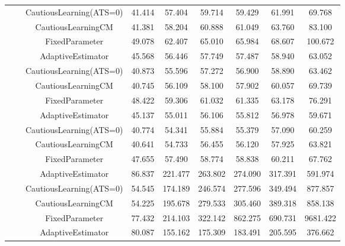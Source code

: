 \begin{table}[!h]
\begin{tabular}[t]{ccccccccc}
 &  & CautiousLearning(ATS=0) & 41.414 & 57.404 & 59.714 & 59.429 & 61.991 & 69.768\\

 &  & CautiousLearningCM & 41.381 & 58.204 & 60.888 & 61.049 & 63.760 & 83.100\\

 & \multirow[t]{-4}{*}{\centering\arraybackslash 1.00} & FixedParameter & 49.078 & 62.407 & 65.010 & 65.984 & 68.607 & 100.672\\
\cmidrule{2-9}
 &  & AdaptiveEstimator & 45.568 & 56.446 & 57.749 & 57.487 & 58.940 & 63.052\\

 &  & CautiousLearning(ATS=0) & 40.873 & 55.596 & 57.272 & 56.900 & 58.890 & 63.462\\

 &  & CautiousLearningCM & 40.745 & 56.109 & 58.100 & 57.902 & 60.057 & 69.739\\

 & \multirow[t]{-4}{*}{\centering\arraybackslash 1.25} & FixedParameter & 48.422 & 59.306 & 61.032 & 61.335 & 63.178 & 76.291\\
\cmidrule{2-9}
 &  & AdaptiveEstimator & 45.137 & 55.011 & 56.106 & 55.812 & 56.978 & 59.671\\

 &  & CautiousLearning(ATS=0) & 40.774 & 54.341 & 55.884 & 55.379 & 57.090 & 60.259\\

 &  & CautiousLearningCM & 40.641 & 54.733 & 56.455 & 56.120 & 57.925 & 63.821\\

\multirow[t]{-28}{*}{\centering\arraybackslash 50} & \multirow[t]{-4}{*}{\centering\arraybackslash 1.50} & FixedParameter & 47.655 & 57.490 & 58.774 & 58.838 & 60.211 & 67.762\\
\cmidrule{1-9}
 &  & AdaptiveEstimator & 86.837 & 221.477 & 263.802 & 274.090 & 317.391 & 591.974\\

 &  & CautiousLearning(ATS=0) & 54.545 & 174.189 & 246.574 & 277.596 & 349.494 & 877.857\\

 &  & CautiousLearningCM & 54.225 & 195.678 & 279.533 & 305.460 & 389.318 & 858.138\\

 & \multirow[t]{-4}{*}{\centering\arraybackslash 0.25} & FixedParameter & 77.432 & 214.103 & 322.142 & 862.275 & 690.731 & 9681.422\\
\cmidrule{2-9}
 &  & AdaptiveEstimator & 80.087 & 155.162 & 175.309 & 183.491 & 205.595 & 376.662\\


\end{tabular}
\end{table}
